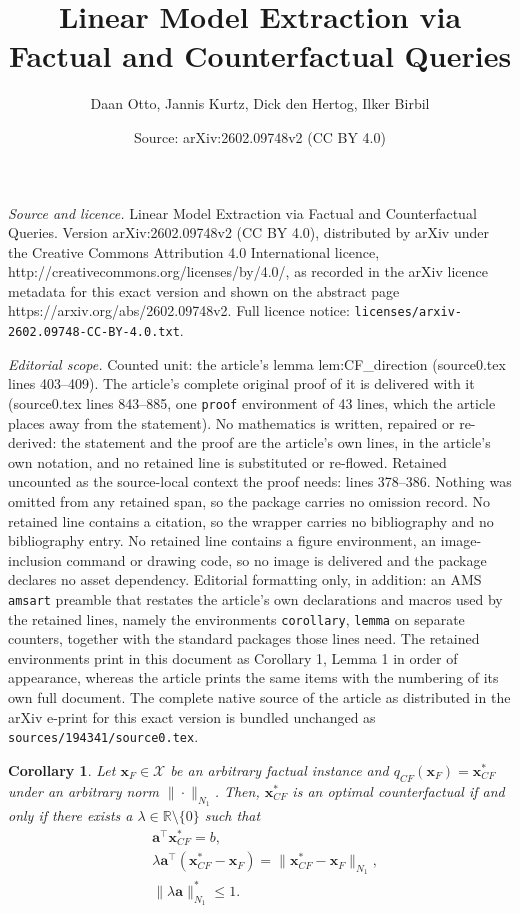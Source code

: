 \documentclass[10pt,a4paper]{amsart}
\title{Linear Model Extraction via Factual and Counterfactual Queries}
\author{Daan Otto, Jannis Kurtz, Dick den Hertog, Ilker Birbil}
\date{Source: arXiv:2602.09748v2 (CC BY 4.0)}
\newtheorem{corollary}{Corollary}
\begin{document}
\maketitle

\noindent\emph{Source and licence.} Linear Model Extraction via Factual and Counterfactual Queries. Version arXiv:2602.09748v2 (CC BY 4.0), distributed by arXiv under the Creative Commons Attribution 4.0 International licence, http://creativecommons.org/licenses/by/4.0/, as recorded in the arXiv licence metadata for this exact version and shown on the abstract page https://arxiv.org/abs/2602.09748v2. Full licence notice: \texttt{licenses/arxiv-2602.09748-CC-BY-4.0.txt}.\par\smallskip

\noindent\textit{Editorial scope.} Counted unit: the article's lemma lem:CF\_direction (source0.tex lines 403--409). The article's complete original proof of it is delivered with it (source0.tex lines 843--885, one \texttt{proof} environment of 43 lines, which the article places away from the statement). No mathematics is written, repaired or re-derived: the statement and the proof are the article's own lines, in the article's own notation, and no retained line is substituted or re-flowed.  Retained uncounted as the source-local context the proof needs: lines 378--386.  Nothing was omitted from any retained span, so the package carries no omission record.  No retained line contains a citation, so the wrapper carries no bibliography and no bibliography entry.  No retained line contains a figure environment, an image-inclusion command or drawing code, so no image is delivered and the package declares no asset dependency.  Editorial formatting only, in addition: an AMS \texttt{amsart} preamble that restates the article's own declarations and macros used by the retained lines, namely the environments \texttt{corollary}, \texttt{lemma} on separate counters, together with the standard packages those lines need.  The retained environments print in this document as Corollary 1, Lemma 1 in order of appearance, whereas the article prints the same items with the numbering of its own full document.  The complete native source of the article as distributed in the arXiv e-print for this exact version is bundled unchanged as \texttt{sources/194341/source0.tex}.
\begin{corollary}
\label{cor:optimality_conditions_CF_non_differentiable_norm}
Let $\bm{x}_F\in \mathcal X$ be an arbitrary factual instance and $q_{CF}(\bm{x}_F) = \bm{x}_{CF}^*$ under an arbitrary norm $ \| \cdot \|_{N_1}$.  Then, $\bm{x}_{CF}^*$ is an optimal counterfactual if and only if there exists a $\lambda\in\mathbb R\setminus \{ 0\}$ such that
\begin{align*}
    &\bm{a}^\top \bm{x}_{CF}^* = b, \\
    &  \lambda \bm{a}^\top (\bm{x}_{CF}^* - \bm{x}_F) = \|\bm{x}_{CF}^* - \bm{x}_F\|_{N_1}, \\
    & \|\lambda \bm{a} \|_{N_1}^* \le 1 .
\end{align*}    
\end{corollary}
\end{document}
